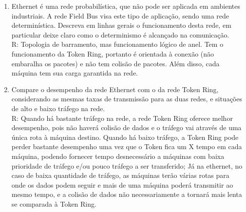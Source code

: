 \documentclass{article}
\begin{document}
\begin{enumerate}
\begin{enumerate}
\end{enumerate}

	\item Ethernet é uma rede probabilística, que não pode ser aplicada em ambientes industriais. A rede Field Bus visa este tipo de aplicação, sendo uma rede determinística. Descreva em linhas gerais o funcionamento desta rede, em particular deixe claro como o determinismo é alcançado na comunicação.
	\\R: Topologia de barramento, mas funcionamento lógico de anel. Tem o funcionamento da Token Ring, portanto é orientada à conexão (não embaralha os pacotes) e não tem colisão de pacotes. Além disso, cada máquina tem sua carga garantida na rede.

	\item Compare o desempenho da rede Ethernet com o da rede Token Ring, considerando as mesmas taxas de transmissão para as duas redes, e situações de alto e baixo tráfego na rede.
	\\R: Quando há bastante tráfego na rede, a rede Token Ring oferece melhor desempenho, pois não haverá colisão de dados e o tráfego vai através de uma única rota à máquina destino. Quando há baixo tráfego, a Token Ring pode perder bastante desempenho uma vez que o Token fica um X tempo em cada máquina, podendo fornecer tempo desnecessário a máquinas com baixa prioridade de tráfego e/ou pouco tráfego a ser transferido; Já na ethernet, no caso de baixa quantidade de tráfego, as máquinas terão várias rotas para onde os dados podem seguir e mais de uma máquina poderá transmitir ao mesmo tempo, e a colisão de dados não necessariamente a tornará mais lenta se comparada à Token Ring.


\end{enumerate}
\end{document}
